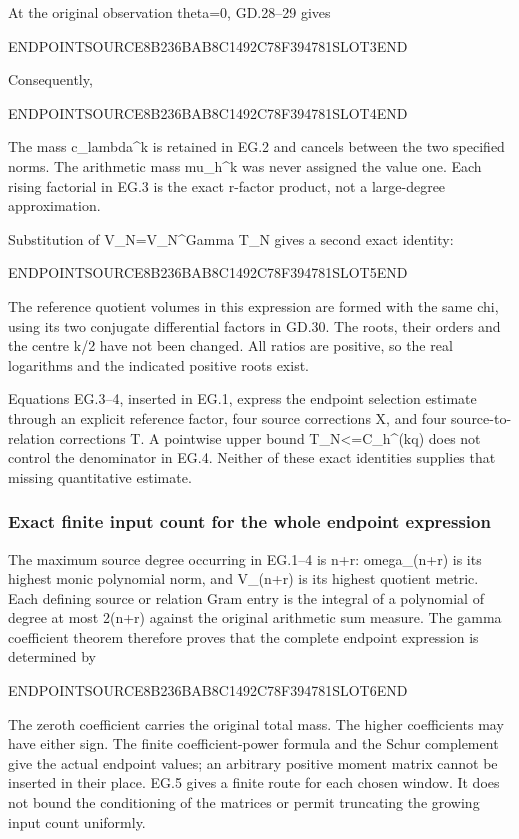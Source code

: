 At the original observation theta=0, GD.28--29 gives

ENDPOINTSOURCE8B236BAB8C1492C78F394781SLOT3END

Consequently,

ENDPOINTSOURCE8B236BAB8C1492C78F394781SLOT4END

The mass c\_lambda\^{}k is retained in EG.2 and cancels between the two specified norms. The arithmetic mass mu\_h\^{}k was never assigned the value one. Each rising factorial in EG.3 is the exact r-factor product, not a large-degree approximation.

Substitution of V\_N=V\_N\^{}Gamma T\_N gives a second exact identity:

ENDPOINTSOURCE8B236BAB8C1492C78F394781SLOT5END

The reference quotient volumes in this expression are formed with the same chi, using its two conjugate differential factors in GD.30. The roots, their orders and the centre k/2 have not been changed. All ratios are positive, so the real logarithms and the indicated positive roots exist.

Equations EG.3--4, inserted in EG.1, express the endpoint selection estimate through an explicit reference factor, four source corrections X, and four source-to-relation corrections T. A pointwise upper bound T\_N\textless=C\_h\^{}(kq) does not control the denominator in EG.4. Neither of these exact identities supplies that missing quantitative estimate.

\subsubsection{Exact finite input count for the whole endpoint expression}\label{endpoint-eg_original--exact-finite-input-count-for-the-whole-endpoint-expression}

The maximum source degree occurring in EG.1--4 is n+r: omega\_(n+r) is its highest monic polynomial norm, and V\_(n+r) is its highest quotient metric. Each defining source or relation Gram entry is the integral of a polynomial of degree at most 2(n+r) against the original arithmetic sum measure. The gamma coefficient theorem therefore proves that the complete endpoint expression is determined by

ENDPOINTSOURCE8B236BAB8C1492C78F394781SLOT6END

The zeroth coefficient carries the original total mass. The higher coefficients may have either sign. The finite coefficient-power formula and the Schur complement give the actual endpoint values; an arbitrary positive moment matrix cannot be inserted in their place. EG.5 gives a finite route for each chosen window. It does not bound the conditioning of the matrices or permit truncating the growing input count uniformly.


